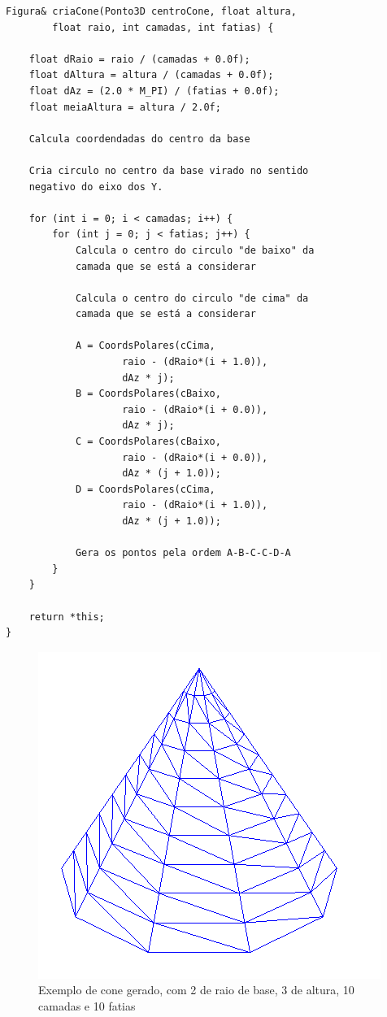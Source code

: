 \begin{Verbatim}
Figura& criaCone(Ponto3D centroCone, float altura, 
		float raio, int camadas, int fatias) {
	
	float dRaio = raio / (camadas + 0.0f);
	float dAltura = altura / (camadas + 0.0f);
	float dAz = (2.0 * M_PI) / (fatias + 0.0f);
	float meiaAltura = altura / 2.0f;
	
	Calcula coordendadas do centro da base
	
	Cria circulo no centro da base virado no sentido
	negativo do eixo dos Y.
	
	for (int i = 0; i < camadas; i++) {
		for (int j = 0; j < fatias; j++) {
			Calcula o centro do circulo "de baixo" da
			camada que se está a considerar
			
			Calcula o centro do circulo "de cima" da
			camada que se está a considerar
			
			A = CoordsPolares(cCima,
					raio - (dRaio*(i + 1.0)),
					dAz * j);
			B = CoordsPolares(cBaixo,
					raio - (dRaio*(i + 0.0)),
					dAz * j);
			C = CoordsPolares(cBaixo,
					raio - (dRaio*(i + 0.0)),
					dAz * (j + 1.0));
			D = CoordsPolares(cCima,
					raio - (dRaio*(i + 1.0)),
					dAz * (j + 1.0));
			
			Gera os pontos pela ordem A-B-C-C-D-A
		}
	}
	
	return *this;
}
\end{Verbatim}

\begin{figure}[<+htpb+>]
	\centering
	\includegraphics[scale=0.5]{imagens/p3_cone_2_3_10_10.png}
	\caption{Exemplo de cone gerado, com 2 de raio de base, 3 de altura, 10 camadas e 10 fatias}
	\label{p1:fig:p3_cone_2_3_10_10}
\end{figure}

